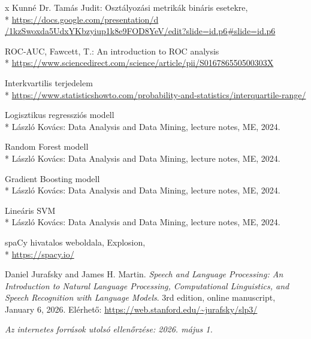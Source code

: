 \begin{thebibliography}{x}
 Kunné Dr. Tamás Judit: Osztályozási metrikák bináris esetekre,\\*
\url{https://docs.google.com/presentation/d
/1kzSwoxda5UdxYKbzyiup1k8e9FOD8YeV/edit?slide=id.p6#slide=id.p6}

 ROC-AUC, Fawcett, T.: An introduction to ROC analysis\\*
\url{https://www.sciencedirect.com/science/article/pii/S016786550500303X}

 Interkvartilis terjedelem\\*
\url{https://www.statisticshowto.com/probability-and-statistics/interquartile-range/}

 Logisztikus regressziós modell\\*
László Kovács: Data Analysis and Data Mining, lecture notes, ME, 2024.

 Random Forest modell\\*
László Kovács: Data Analysis and Data Mining, lecture notes, ME, 2024.

 Gradient Boosting modell\\*
László Kovács: Data Analysis and Data Mining, lecture notes, ME, 2024.

 Lineáris SVM\\*
László Kovács: Data Analysis and Data Mining, lecture notes, ME, 2024.

 spaCy hivatalos weboldala, Explosion,\\*
\url{https://spacy.io/}

Daniel Jurafsky and James H. Martin.
\newblock \textit{Speech and Language Processing: An Introduction to Natural Language Processing, Computational Linguistics, and Speech Recognition with Language Models}.
\newblock 3rd edition, online manuscript, January 6, 2026.
\newblock Elérhető: \url{https://web.stanford.edu/~jurafsky/slp3/}


\end{thebibliography}

\noindent \textit{Az internetes források utolsó ellenőrzése: 2026. május 1.}